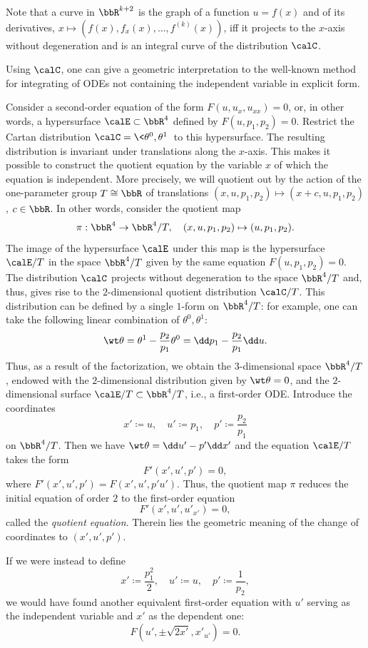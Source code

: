 Note that a curve in $\bbR^{k+2}$ is the graph of a function $u=f(x)$ and of its derivatives, $x\mapsto (f(x),f_x(x),\ldots,f^{(k)}(x))$, iff it projects to the $x$-axis without degeneration and is an integral curve of the distribution $\calC$.  

Using $\calC$, one can give a geometric interpretation to the well-known method for integrating of ODEs not containing the independent variable in explicit form. 

\begin{example}
    Consider a second-order equation of the form $F(u,u_x,u_{xx})=0$, or, in other words, a hypersurface $\calE\subset\bbR^4$ defined by $F(u,p_1,p_2)=0$. Restrict the Cartan distribution $\calC=\<\theta^0,\theta^1\>$ to this hypersurface. The resulting distribution is invariant under translations along the $x$-axis. This makes it possible to construct the quotient equation by the variable $x$ of which the equation is independent. More precisely, we will quotient out by the action of the one-parameter group $T\cong \bbR$ of translations $(x,u,p_1,p_2)\mapsto (x+c,u,p_1,p_2)$, $c\in \bbR$. In other words, consider the quotient map 
    \[\pi:\bbR^4\to \bbR^4\slash T,\quad (x,u,p_1,p_2)\mapsto (u,p_1,p_2).\]
    The image of the hypersurface $\calE$ under this map is the hypersurface $\calE\slash T$ in the space $\bbR^4\slash T$ given by the same equation $F(u,p_1,p_2)=0$. The distribution $\calC$ projects without degeneration to the space $\bbR^4\slash T$ and, thus, gives rise to the $2$-dimensional quotient distribution $\calC\slash T$. This distribution can be defined by a single $1$-form on $\bbR^4\slash T$: for example, one can take the following linear combination of $\theta^0,\theta^1$:
    \[\wt\theta=\theta^1-\frac{p_2}{p_1}\theta^0=\dd p_1-\frac{p_2}{p_1}\dd u.\]
    Thus, as a result of the factorization, we obtain the $3$-dimensional space $\bbR^4\slash T$, endowed with the $2$-dimensional distribution given by $\wt\theta=0$, and the $2$-dimensional surface $\calE\slash T\subset \bbR^4\slash T$, i.e., a first-order ODE. Introduce the coordinates 
    \[x'\coloneqq u,\quad u'\coloneqq p_1,\quad p'\coloneqq \frac{p_2}{p_1}\label{eq 2.2 Kras}\]
    on $\bbR^4\slash T$. Then we have $\wt\theta=\dd u'-p'\dd x'$ and the equation $\calE\slash T$ takes the form 
    \[F'(x',u',p')=0,\]
    where $F'(x',u',p')=F(x',u',p'u')$. Thus, the quotient map $\pi$ reduces the initial equation of order $2$ to the first-order equation 
    \[F'(x',u',u'_{x'})=0,\]
    called the \emph{quotient equation}. Therein lies the geometric meaning of the change of coordinates to $(x',u',p')$.
    
    If we were instead to define 
    \[x'\coloneqq \frac{p_1^2}{2},\quad u'\coloneqq u,\quad p'\coloneqq \frac{1}{p_2},\]
    we would have found another equivalent first-order equation with $u'$ serving as the independent variable and $x'$ as the dependent one:
    \[F(u',\pm\sqrt{2x'},x'_{u'})=0.\]
\end{example}


